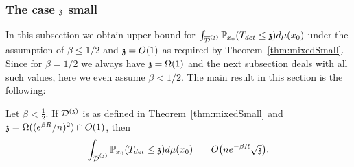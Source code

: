 \subsubsection{The case $\ss$ small}
In this subsection we obtain upper bound for $\int_{\ndt}\PP_{x_0}(T_{det}\leq \ss)d\mu(x_0)$ under the assumption of $\beta\leq1/2$ and $\ss=O(1)$ as required by Theorem~\ref{thm:mixedSmall}. Since for $\beta=1/2$ we always have $\ss=\Omega(1)$ and the next subsection deals with all such values, here we even assume $\beta < 1/2$. The main result in this section is the following:
\begin{proposition}\label{generalschico}
Let $\beta<\frac{1}{2}$. If $\dt$ is as defined in Theorem~\ref{thm:mixedSmall} and $\ss=\Omega((e^{\beta R}/n)^{2})\cap O(1)$, then
\[\int_{\ndt}\P_{x_0}(T_{det}\leq \ss)d\mu(x_0) 
\;=\;O\big(ne^{-\beta R}\sqrt{\ss}\big).\]
\end{proposition}
